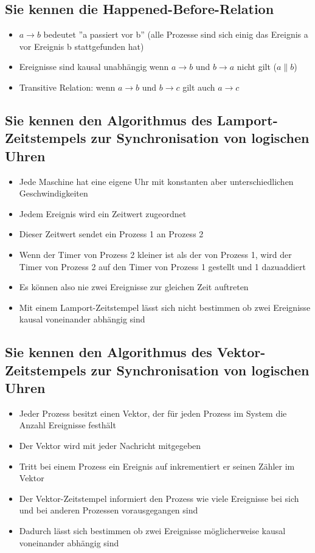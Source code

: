 \subsection{Sie kennen die Happened-Before-Relation}

\begin{itemize}
	\item $a \rightarrow b$ bedeutet ''a passiert vor b'' (alle Prozesse sind sich einig das Ereignis a vor Ereignis b stattgefunden hat)
	\item Ereignisse sind kausal unabhängig wenn $a \rightarrow b$ und $b \rightarrow a$ nicht gilt ($a \parallel b$)
	\item Transitive Relation: wenn $a \rightarrow b$ und $b \rightarrow c$ gilt auch $a \rightarrow c$
\end{itemize}

\subsection{Sie kennen den Algorithmus des Lamport-Zeitstempels zur Synchronisation von logischen Uhren}

\begin{itemize}
	\item Jede Maschine hat eine eigene Uhr mit konstanten aber unterschiedlichen Geschwindigkeiten
	\item Jedem Ereignis wird ein Zeitwert zugeordnet
	\item Dieser Zeitwert sendet ein Prozess 1 an Prozess 2
	\item Wenn der Timer von Prozess 2 kleiner ist als der von Prozess 1, wird der Timer von Prozess 2 auf den Timer von Prozess 1 gestellt und 1 dazuaddiert
	\item Es können also nie zwei Ereignisse zur gleichen Zeit auftreten
	\item Mit einem Lamport-Zeitstempel lässt sich nicht bestimmen ob zwei Ereignisse kausal voneinander abhängig sind
\end{itemize}


\subsection{Sie kennen den Algorithmus des Vektor-Zeitstempels zur Synchronisation von logischen Uhren}

\begin{itemize}
	\item Jeder Prozess besitzt einen Vektor, der für jeden Prozess im System die Anzahl Ereignisse festhält
	\item Der Vektor wird mit jeder Nachricht mitgegeben
	\item Tritt bei einem Prozess ein Ereignis auf inkrementiert er seinen Zähler im Vektor
	\item Der Vektor-Zeitstempel informiert den Prozess wie viele Ereignisse bei sich und bei anderen Prozessen vorausgegangen sind
	\item Dadurch lässt sich bestimmen ob zwei Ereignisse möglicherweise kausal voneinander abhängig sind
\end{itemize}

